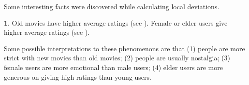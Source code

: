 \documentclass{ece}
\begin{document}
Some interesting facts were discovered while calculating local deviations.

\begin{figure}[ht!]
\begin{floatrow}

\end{floatrow}
\end{figure}

\textbf{1}. Old movies have higher average ratings (see ). Female or elder users give higher average ratings (see ).

Some possible interpretations to these phenomenons are that (1) people are more strict with new movies than old movies;
(2) people are usually nostalgia; (3) female users are more emotional than male users; (4) elder users are more generous on giving high ratings than young users.
\end{document}
